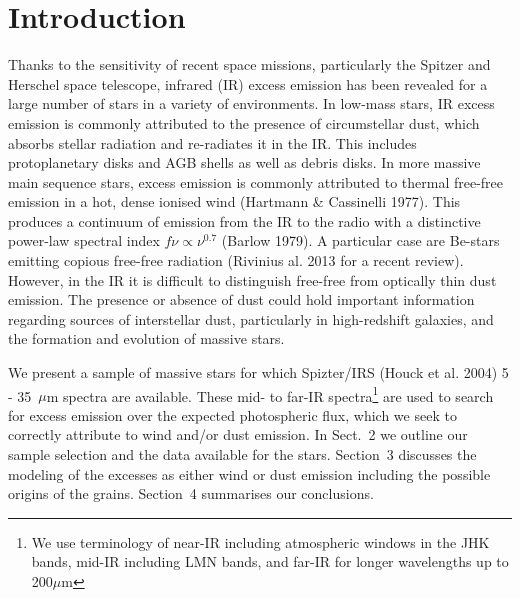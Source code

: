 \documentclass[tradiabstract]{aa} %
\begin{document}
\maketitle



\section{Introduction}
Thanks to the sensitivity of recent space missions, particularly the
Spitzer and Herschel space telescope, infrared (IR) excess emission has been
revealed for a large number of stars in a variety of environments.  In
low-mass stars, IR excess emission is commonly attributed to the
presence of circumstellar dust, which absorbs stellar radiation and
re-radiates it in the IR.  This includes protoplanetary disks and AGB
shells as well as debris disks.  In more massive main sequence stars,
excess emission is commonly attributed to thermal free-free emission
in a hot, dense ionised wind (Hartmann \& Cassinelli 1977). This
produces a continuum of emission from the IR to the radio with a
distinctive power-law spectral index $f{\nu} \propto \nu^{0.7}$
(Barlow 1979). A particular case are Be-stars emitting copious
free-free radiation (Rivinius al. 2013 for a recent review). However,
in the IR it is difficult to distinguish free-free from optically thin
dust emission.  The presence or absence of dust could hold important
information regarding sources of interstellar dust, particularly in
high-redshift galaxies, and the formation and evolution of massive
stars.

We present a sample of massive stars for which Spizter/IRS (Houck et
al. 2004) 5 - 35\, $\mu$m spectra are available.  These mid- to far-IR
spectra{\footnote {We use terminology of near-IR including atmospheric
    windows in the JHK bands, mid-IR including LMN bands, and far-IR
    for longer wavelengths up to 200$\mu$m}} are used to search for
excess emission over the expected photospheric flux, which we seek to
correctly attribute to wind and/or dust emission. In Sect.~2 we
outline our sample selection and the data available for the
stars. Section~3 discusses the modeling of the excesses as either wind
or dust emission including the possible origins of the
grains. Section~4 summarises our conclusions.
\end{document}
